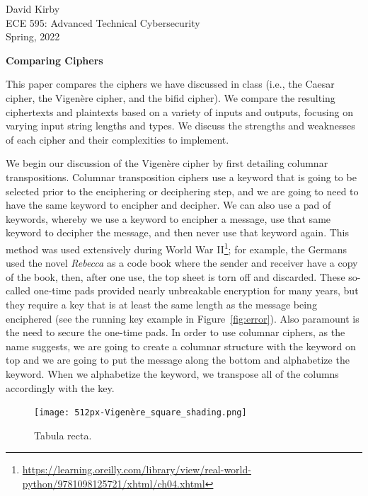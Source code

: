 \documentclass[12pt]{article}
\begin{document}
\setmainfont{SF Pro Text}
\setsansfont{SF Pro Text}
\setmonofont{SF Mono}
\renewcommand{\familydefault}{\sfdefault}

\hypersetup{
    linkcolor=CrispBlue,
    urlcolor=CrispBlue,
    breaklinks=true
}

\noindent David Kirby\\
ECE 595: Advanced Technical Cybersecurity\\
Spring, 2022
\begin{center}
    \large\bfseries Comparing Ciphers
\end{center}

This paper compares the ciphers we have discussed in class (i.e., the Caesar cipher, the Vigen\`ere cipher, and the bifid cipher). We compare the resulting ciphertexts and plaintexts based on a variety of inputs and outputs, focusing on varying input string lengths and types. We discuss the strengths and weaknesses of each cipher and their complexities to implement.

We begin our discussion of the Vigen\`ere cipher by first detailing columnar transpositions. Columnar transposition ciphers use a keyword that is going to be selected prior to the enciphering or deciphering step, and we are going to need to have the same keyword to encipher and decipher. We can also use a pad of keywords, whereby we use a keyword to encipher a message, use that same keyword to decipher the message, and then never use that keyword again. This method was used extensively during World War II\footnote{\href{https://learning.oreilly.com/library/view/real-world-python/9781098125721/xhtml/ch04.xhtml}{https://learning.oreilly.com/library/view/real-world-python/9781098125721/xhtml/ch04.xhtml}}; for example, the Germans used the novel \textit{Rebecca} as a code book where the sender and receiver have a copy of the book, then, after one use, the top sheet is torn off and discarded. These so-called one-time pads provided nearly unbreakable encryption for many years, but they require a key that is at least the same length as the message being enciphered (see the running key example in Figure~\ref{fig:error}). Also paramount is the need to secure the one-time pads. In order to use columnar ciphers, as the name suggests, we are going to create a columnar structure with the keyword on top and we are going to put the message along the bottom and alphabetize the keyword. When we alphabetize the keyword, we transpose all of the columns accordingly with the key.

\begin{figure}[!ht]
    \centering
    \texttt{[image: 512px-Vigenère\_square\_shading.png]}
    \caption{Tabula recta.}
    \label{fig:tabula}
\end{figure}
\end{document}
